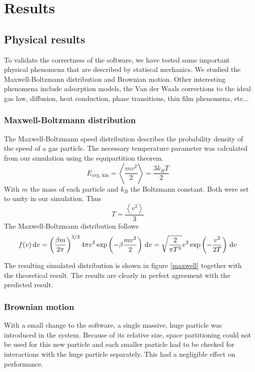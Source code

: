 \section{Results}
\subsection{Physical results}

To validate the correctness of the software, we have tested some important 
physical phenomena that are described by statiscal mechanics. We studied the 
Maxwell-Boltzmann distribution and Brownian motion. Other interesting phenomena 
include adsorption models, the Van der Waals corrections to the ideal gas law, 
diffusion, heat conduction, phase transitions, thin film phenomena, etc...

\subsubsection{Maxwell-Boltzmann distribution}
The Maxwell-Boltzmann speed distribution describes the probability density of 
the speed of a gas particle. The necessary temperature parameter was calculated 
from our simulation using the equipartition theorem.
$$
E_{\textrm{avg, kin}} = \left< \frac{mv^2}{2} \right> = \frac{3k_BT}{2}
$$
With $m$ the mass of each particle and $k_B$ the Boltzmann constant. Both were 
set to unity in our simulation. Thus
$$
T = \frac{\left< v^2 \right>}{3}
$$
The Maxwell-Boltzmann distribution follows
$$
f(v)\,\mathrm d v = \left( \frac{\beta m}{2 \pi} \right)^{3/2} 4 \pi v^2
\exp\left( -\beta \frac{mv^2}{2}\right) \,\mathrm d v =
\sqrt{ \frac{2}{\pi T^3} } v^2 \exp \left(-\frac{v^2}{2T}\right) \,\mathrm d v
$$

The resulting simulated distribution is shown in figure \ref{maxwell} together 
with the theoretical result. The results are clearly in perfect agreement with 
the predicted result.

\subsubsection{Brownian motion}
With a small change to the software, a single massive, huge particle was 
introduced in the system. Because of its relative size, space partitioning 
could not be used for this new particle and each smaller particle had to be 
checked for interactions with the huge particle separately. This had a 
negligible effect on performance.

